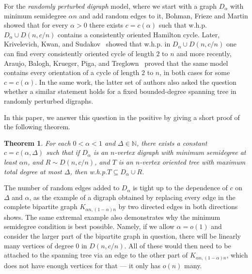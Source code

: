 \documentclass[10pt, a4paper]{article}
\newtheorem{theorem}{Theorem}
\theoremstyle{remark}
\begin{document}
For the \emph{randomly perturbed digraph} model, where we start with a graph $D_\alpha$ with minimum semidegree $\alpha n$ and add random edges to it, Bohman, Frieze and Martin \cite{bohman_perturbed} showed that for every $\alpha > 0$ there exists $c = c(\alpha)$ such that w.h.p. $D_\alpha \cup D(n, c/n)$ contains a consistently oriented Hamilton cycle.
Later, Krivelevich, Kwan, and Sudakov~\cite{krivelevich2016cycles} showed that w.h.p. in $D_\alpha \cup D(n, c/n)$ one can find every consistently oriented cycle of length $2$ to $n$ and more recently, Araujo, Balogh, Krueger, Piga, and Treglown~\cite{araujo_oriented_2022} proved that the same model contains every orientation of a cycle of length $2$ to $n$, in both cases for some $c = c(\alpha)$.
In the same work, the latter set of authors also asked the question whether a similar statement holds for a fixed bounded-degree spanning tree in randomly perturbed digraphs.

In this paper, we answer this question in the positive by giving a short proof of the following theorem.
\begin{theorem}\label{theorem:maintheorem}
    For each $0 < \alpha <1$ and $ \Delta \in \mathbb{N}$, there exists a constant $c = c(\alpha, \Delta)$ such that if $D_\alpha$ is an $n$-vertex digraph with minimum semidegree at least $\alpha n$,
    and $R \sim D(n,c/n)$, and $T$ is an $n$-vertex oriented tree with maximum total degree at most $\Delta$, then w.h.p.\footnotemark $T \subseteq D_\alpha \cup R$.
\end{theorem}

The number of random edges added to $D_\alpha$ is tight up to the dependence of $c$ on $\Delta$ and $\alpha$, as the example of a digraph obtained by replacing every edge in the complete bipartite graph $K_{\alpha n, (1-\alpha)n}$ by two directed edges in both directions shows. The same extremal example also demonstrates why the minimum semidegree condition is best possible. Namely, if we allow $\alpha = o(1)$ and consider the larger part of the bipartite graph in question, there will be linearly many vertices of degree $0$ in $D(n,c/n)$. All of these would then need to be attached to the spanning tree via an edge to the other part of $K_{\alpha n, (1-\alpha)n}$, which does not have enough vertices for that --- it only has $o(n)$ many.
\end{document}
